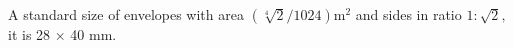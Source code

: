 A standard size of envelopes with area $ ( \sqrt[4]{2} /1024 ) \mathrm{m} ^2 $ 
and sides in ratio $ 1 : \sqrt{2} , $ it is  28 \ensuremath{ \times } 40  mm.